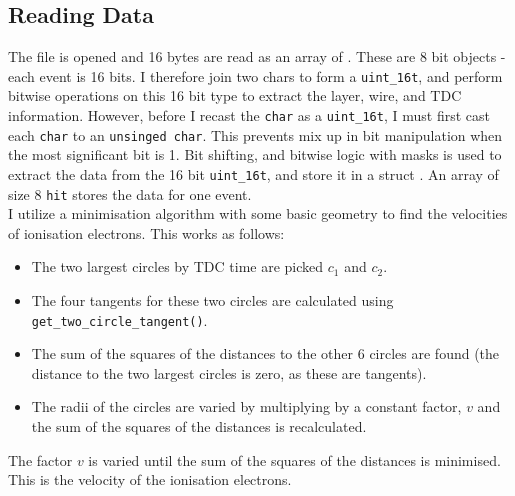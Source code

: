 \documentclass[11pt]{article}
\begin{document}
\subsection{Reading Data}
\label{sec:reading}
The file is opened and 16 bytes are read as an array of . These are 8 bit objects - each event is 16 bits. I therefore join two chars to form a \texttt{uint\_16t}, and perform bitwise operations on this 16 bit type to extract the layer, wire, and TDC information. However, before I recast the \texttt{char} as a \texttt{uint\_16t}, I must first cast each \texttt{char} to an \texttt{unsinged char}. This prevents mix up in bit manipulation when the most significant bit is 1. Bit shifting, and bitwise logic with masks is used to extract the data from the 16 bit \texttt{uint\_16t}, and store it in a struct . An array of size 8 \texttt{hit} stores the data for one event.\\


I utilize a minimisation algorithm with some basic geometry to find the velocities of ionisation electrons. This works as follows:
\begin{itemize}
    \item The two largest circles by TDC time are picked $c_1$ and $c_2$.
    \item The four tangents for these two circles are calculated using \texttt{get\_two\_circle\_tangent()}.
    \item The sum of the squares of the distances to the other 6 circles are found (the distance to the two largest circles is zero, as these are tangents).
    \item The radii of the circles are varied by multiplying by a constant factor, $v$ and the sum of the squares of the distances is recalculated.
\end{itemize}
The factor $v$ is varied until the sum of the squares of the distances is minimised. This is the velocity of the ionisation electrons.
\end{document}
